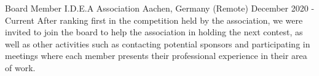 

\begin{cventries}

  \cventry
    {Board Member} %
    {I.D.E.A Association} %
    {Aachen, Germany (Remote)} %
    {December 2020 - Current} %
    {
      After ranking first in the competition held by the association, we were invited to join the board to help the association in holding the next contest, as well as other activities such as contacting potential sponsors and participating in meetings where each member presents their professional experience in their area of work.
    }

\end{cventries}
